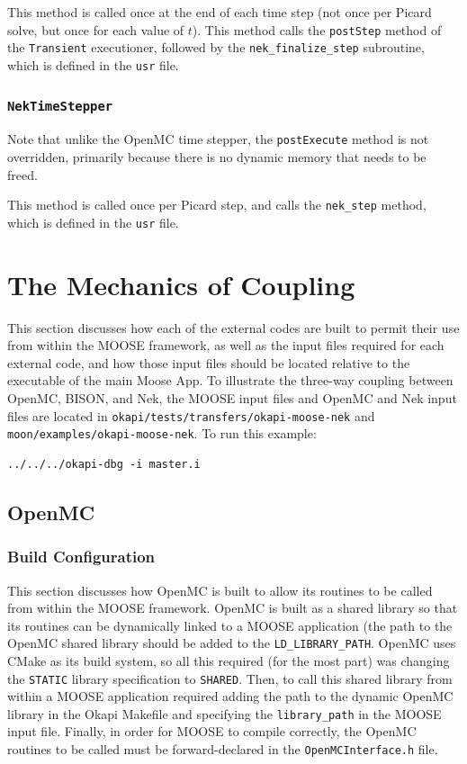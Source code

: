 \documentclass[10pt]{article}
\newcounter{subsubsubsection}[subsubsection]
\numberwithin{equation}{section} %
\begin{document}
This method is called once at the end of each time step (not once per Picard solve, but once for each value of \(t\)). This method calls the {\tt postStep} method of the {\tt Transient} executioner, followed by the {\tt nek\_finalize\_step} subroutine, which is defined in the {\tt usr} file.

\subsubsection{{\tt NekTimeStepper}}
Note that unlike the OpenMC time stepper, the {\tt postExecute} method is not overridden, primarily because there is no dynamic memory that needs to be freed.

This method is called once per Picard step, and calls the {\tt nek\_step} method, which is defined in the {\tt usr} file.

\clearpage
\section{The Mechanics of Coupling}
This section discusses how each of the external codes are built to permit their use from within the MOOSE framework, as well as the input files required for each external code, and how those input files should be located relative to the executable of the main Moose App. To illustrate the three-way coupling between OpenMC, BISON, and Nek, the MOOSE input files and OpenMC and Nek input files are located in {\tt okapi/tests/transfers/okapi-moose-nek} and {\tt moon/examples/okapi-moose-nek}. To run this example:

\begin{lstlisting}
../../../okapi-dbg -i master.i
\end{lstlisting}

\subsection{OpenMC}

\subsubsection{Build Configuration}
This section discusses how OpenMC is built to allow its routines to be called from within the MOOSE framework. OpenMC is built as a shared library so that its routines can be dynamically linked to a MOOSE application (the path to the OpenMC shared library should be added to the {\tt LD\_LIBRARY\_PATH}. OpenMC uses CMake as its build system, so all this required (for the most part) was changing the {\tt STATIC} library specification to {\tt SHARED}. Then, to call this shared library from within a MOOSE application required adding the path to the dynamic OpenMC library in the Okapi Makefile and specifying the {\tt library\_path} in the MOOSE input file. Finally, in order for MOOSE to compile correctly, the OpenMC routines to be called must be forward-declared in the {\tt OpenMCInterface.h} file.
\end{document}
